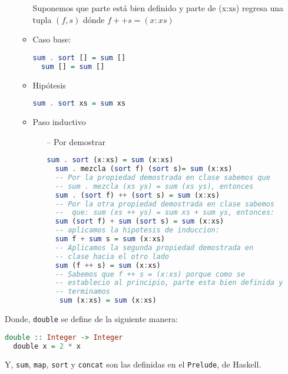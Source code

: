 \documentclass[spanish,12pt,letterpaper]{article}
\begin{document}
\begin{itemize}
\begin{itemize}
    Suponemos que parte está bien definido y parte de (x:xs) regresa una
    tupla $(f,s)$ dónde $f ++ s = (x:xs) $

    \item Caso base:
    \begin{lstlisting}[language=Haskell]
  sum . sort [] = sum []
  sum [] = sum [] \end{lstlisting}
  \item Hipótesis
    \begin{lstlisting}[language=Haskell]
  sum . sort xs = sum xs \end{lstlisting}
  \item Paso inductivo
    \begin{itemize}
    \item [--] Por demostrar
    \begin{lstlisting}[language=Haskell]
  sum . sort (x:xs) = sum (x:xs)
  sum . mezcla (sort f) (sort s)= sum (x:xs)
  -- Por la propiedad demostrada en clase sabemos que
  -- sum . mezcla (xs ys) = sum (xs ys), entonces
  sum . (sort f) ++ (sort s) = sum (x:xs)
  -- Por la otra propiedad demostrada en clase sabemos
  --  que: sum (xs ++ ys) = sum xs + sum ys, entonces:
  sum (sort f) + sum (sort s) = sum (x:xs)
  -- aplicamos la hipotesis de induccion:
  sum f + sum s = sum (x:xs)
  -- Aplicamos la segunda propiedad demostrada en
  -- clase hacia el otro lado
  sum (f ++ s) = sum (x:xs)
  -- Sabemos que f ++ s = (x:xs) porque como se
  -- establecio al principio, parte esta bien definida y
  -- terminamos
   sum (x:xs) = sum (x:xs) \end{lstlisting}
    \end{itemize}
  \end{itemize}

\end{itemize}
Donde, \texttt{double} se define de la siguiente manera:
\begin{lstlisting}[language=Haskell]
  double :: Integer -> Integer
  double x = 2 * x\end{lstlisting}
Y, \texttt{sum}, \texttt{map}, \texttt{sort} y \texttt{concat} son las definidas en
el \texttt{Prelude}, de Haskell.
\end{document}
